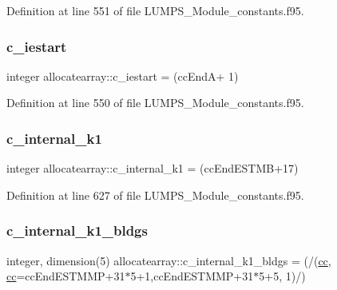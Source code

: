 Definition at line 551 of file L\+U\+M\+P\+S\+\_\+\+Module\+\_\+constants.\+f95.

\mbox{\label{namespaceallocatearray_a843f1c5df3eceab017e76237dbd6f89f}} 
\subsubsection{\texorpdfstring{c\+\_\+iestart}{c\_iestart}}
{\footnotesize\ttfamily integer allocatearray\+::c\+\_\+iestart = (cc\+EndA+ 1)}



Definition at line 550 of file L\+U\+M\+P\+S\+\_\+\+Module\+\_\+constants.\+f95.

\mbox{\label{namespaceallocatearray_a3bf034676d212cb2195d9a262c49554a}} 
\subsubsection{\texorpdfstring{c\+\_\+internal\+\_\+k1}{c\_internal\_k1}}
{\footnotesize\ttfamily integer allocatearray\+::c\+\_\+internal\+\_\+k1 = (cc\+End\+E\+S\+T\+MB+17)}



Definition at line 627 of file L\+U\+M\+P\+S\+\_\+\+Module\+\_\+constants.\+f95.

\mbox{\label{namespaceallocatearray_af2158ba2afb645dfef8aeb1a93a1dec7}} 
\subsubsection{\texorpdfstring{c\+\_\+internal\+\_\+k1\+\_\+bldgs}{c\_internal\_k1\_bldgs}}
{\footnotesize\ttfamily integer, dimension(5) allocatearray\+::c\+\_\+internal\+\_\+k1\+\_\+bldgs = (/(\hyperlink{namespaceallocatearray_ac863c81704eb507dee10f5e10741e10c}{cc}, \hyperlink{namespaceallocatearray_ac863c81704eb507dee10f5e10741e10c}{cc}=cc\+End\+E\+S\+T\+M\+MP+31$\ast$5+1,cc\+End\+E\+S\+T\+M\+MP+31$\ast$5+5, 1)/)}



